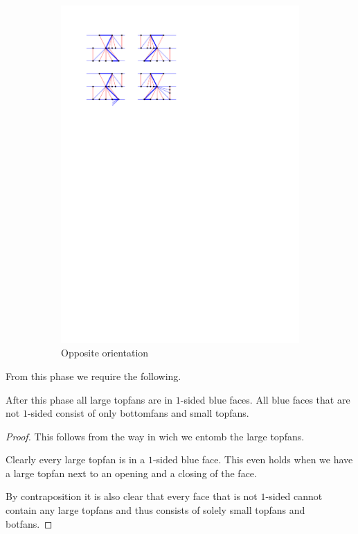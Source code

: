 \begin{figure}
\begin{subfigure}[b]{0.45 \textwidth}
        \includegraphics[width =\textwidth]{unifiedAlgo/img/post/oppChain}
        \caption{Opposite orientation}
    \end{subfigure}
    	\caption{}
\label{fig:uni:chains}
\end{figure}

From this phase we require the following.
\begin{lemma}
  \label{lm:}
  After this phase all large topfans are in $1$-sided blue faces. All blue faces that are not $1$-sided consist of only bottomfans and small topfans.
\end{lemma}
\begin{proof}
  This follows from the way in wich we entomb the large topfans.

  Clearly every large topfan is in a $1$-sided blue face. This even holds when we have a large topfan next to an opening and a closing of the face.

   By contraposition it is also clear that every face that is not $1$-sided cannot contain any large topfans and  thus consists of solely small topfans and botfans.
\end{proof}

